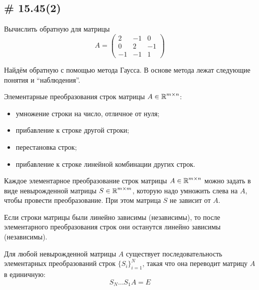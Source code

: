 \documentclass[a4paper,12pt]{article}
\begin{document}
  
  \subsection{\# 15.45(2)}
  
  Вычислить обратную для матрицы
  \[
    A = \begin{pmatrix}
      2 & -1 & 0\\
      0 & 2 & -1\\
      -1 & -1 & 1
    \end{pmatrix}
  \]
  
  \begin{solution}
    Найдём обратную с помощью метода Гаусса.
    В основе метода лежат следующие понятия и ``наблюдения''.
    
    \begin{definition}
      Элементарные преобразования строк матрицы $A \in \operatorname{\mathbb R}^{m\times n}$:
      \begin{itemize}
        \item умножение строки на число, отличное от нуля;
        \item прибавление к строке другой строки;
        \item перестановка строк;
        \item прибавление к строке линейной комбинации других строк.
      \end{itemize}
    \end{definition}
    
    \begin{remark}
      Каждое элементарное преобразование строк матрицы $A \hm\in \RR^{m\times n}$ можно задать в виде невырожденной матрицы $S \hm\in \RR^{m \times m}$, которую надо умножить слева на $A$, чтобы провести преобразование.
      При этом матрица $S$ не зависит от $A$.
    \end{remark}
    
    \begin{remark}
      Если строки матрицы были линейно зависимы (независимы), то после элементарного преобразования строк они останутся линейно зависимы (независимы).
    \end{remark}
    
    \begin{remark}
      Для любой невырожденной матрицы $A$ существует последовательность элементарных преобразований строк $\{S_i\}_{i = 1}^N$, такая что она переводит матрицу $A$ в единичную:
      \[
        S_N \ldots S_1 A = E
      \]
    \end{remark}
    

\end{solution}
\end{document}
